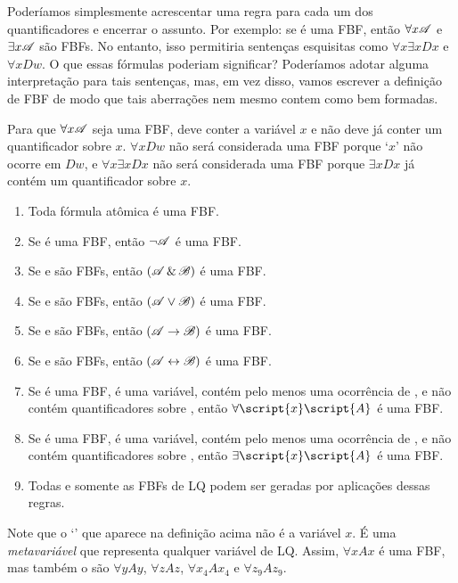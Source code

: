 Poderíamos simplesmente acrescentar uma regra para cada um dos quantificadores e encerrar o assunto. Por exemplo: se  é uma FBF, então $\forall x\mathscr{A}$ e $\exists x\mathscr{A}$ são FBFs. No entanto, isso permitiria sentenças esquisitas como $\forall x\exists x Dx$ e $\forall x Dw$. O que essas fórmulas poderiam significar? Poderíamos adotar alguma interpretação para tais sentenças, mas, em vez disso, vamos escrever a definição de FBF de modo que tais aberrações nem mesmo contem como bem formadas.

Para que $\forall x\mathscr{A}$ seja uma FBF,  deve conter a variável $x$ e não deve já conter um quantificador sobre $x$. $\forall x Dw$ não será considerada uma FBF porque `$x$' não ocorre em $Dw$, e $\forall x \exists x Dx$ não será considerada uma FBF porque $\exists x Dx$ já contém um quantificador sobre $x$.

\begin{enumerate}
\item Toda fórmula atômica é uma FBF.
\item Se  é uma FBF, então $\neg\mathscr{A}$ é uma FBF.
\item Se  e  são FBFs, então $(\mathscr{A}\,\&\,\mathscr{B})$ é uma FBF.
\item Se  e  são FBFs, então $(\mathscr{A}\vee\mathscr{B})$ é uma FBF.
\item Se  e  são FBFs, então $(\mathscr{A}\rightarrow\mathscr{B})$ é uma FBF.
\item Se  e  são FBFs, então $(\mathscr{A}\leftrightarrow\mathscr{B})$ é uma FBF.
\item Se  é uma FBF,  é uma variável,  contém pelo menos uma ocorrência de , e  não contém quantificadores sobre , então $\forall\script{x}\script{A}$ é uma FBF.
\item Se  é uma FBF,  é uma variável,  contém pelo menos uma ocorrência de , e  não contém quantificadores sobre , então $\exists\script{x}\script{A}$ é uma FBF.
\item Todas e somente as FBFs de LQ podem ser geradas por aplicações dessas regras.
\end {enumerate}

Note que o `' que aparece na definição acima não é a variável $x$. É uma \emph{metavariável} que representa qualquer variável de LQ. Assim, $\forall xAx$ é uma FBF, mas também o são $\forall yAy$, $\forall zAz$, $\forall x_4Ax_4$ e $\forall z_9Az_9$.


